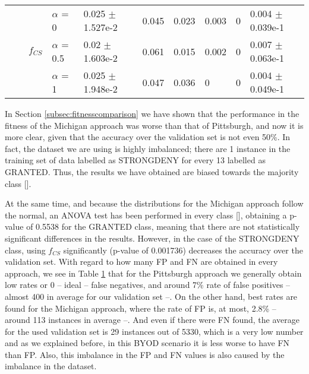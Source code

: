 \begin{table}
{\begin{tabular}{llll|l|l|l|l|l|l|}
			\multicolumn{1}{|l|}{}                                                                                             & \multicolumn{1}{l|}{}                                                                             & \multicolumn{1}{l|}{\multirow{3}{*}{$f_{CS}$}} & $\alpha$ = 0   & 0.025 $\pm$ 1.527e-2 & 0.045 & 0.023  & 0.003 & 0 & 0.004 $\pm$ 0.039e-1 \\ \cline{4-10} 
			\multicolumn{1}{|l|}{}                                                                                             & \multicolumn{1}{l|}{}                                                                             & \multicolumn{1}{l|}{}                          & $\alpha$ = 0.5 & 0.02 $\pm$ 1.603e-2  & 0.061 & 0.015  & 0.002 & 0 & 0.007 $\pm$ 0.063e-1 \\ \cline{4-10} 
			\multicolumn{1}{|l|}{}                                                                                             & \multicolumn{1}{l|}{}                                                                             & \multicolumn{1}{l|}{}                          & $\alpha$ = 1   & 0.025 $\pm$ 1.948e-2 & 0.047 & 0.036  & 0     & 0 & 0.004 $\pm$ 0.049e-1 \\ \hline
		\end{tabular}
	}
	\label{tab:PvsMvalidation}
\end{table}

In Section \ref{subsec:fitnesscomparison} we have shown that the performance in the
fitness of the Michigan approach was worse than that of Pittsburgh,
and now it is more clear, given that the accuracy over the validation set is
not even 50\%. In fact, the dataset we are using is highly imbalanced; there are 1 instance
in the training set of data labelled as STRONGDENY for every 13
labelled as GRANTED. Thus, the results we have obtained are biased towards the majority
class [\cite{japkowicz2002class}]. 

At the same time, and because the distributions for the Michigan approach follow the normal, an ANOVA test has been performed in every class [\cite{DerracTests11}], obtaining a p-value of 0.5538 for the GRANTED class, meaning that there are not statistically significant differences in the results. However, in the case of the STRONGDENY class, using $f_{CS}$ significantly (p-value of 0.001736) decreases the accuracy over the validation set. With regard to how many FP and FN are obtained in every approach, we see in Table \ref{tab:PvsMvalidation} that for the Pittsburgh approach we generally obtain low rates or 0 -- ideal -- false negatives, and around 7\% rate of false positives -- almost 400 in average for our validation set --. On the other hand, best rates are found for the Michigan approach, where the rate of FP is, at most, 2.8\% -- around 113 instances in average --. And even if there were FN found, the average for the used validation set is 29 instances out of 5330, which is a very low number and as we explained before, in this BYOD scenario it is less worse to have FN than FP. Also, this imbalance in the FP and FN values is also caused by the imbalance in the dataset.

